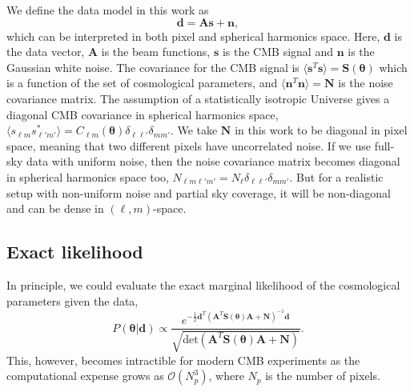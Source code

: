 \documentclass[twocolumn]{../common/aa}
\begin{document}
We define the data model in this work as
\begin{equation}
    \label{eq:data_model}
    \boldsymbol{d} = \boldsymbol{A} \boldsymbol{s} + \boldsymbol{n},
\end{equation}
which can be interpreted in both pixel and spherical harmonics space. Here, $\boldsymbol{d}$ is the data vector, $\boldsymbol{A}$ is the beam functions, $\boldsymbol{s}$ is the CMB signal and $\boldsymbol{n}$ is the Gaussian white noise. The covariance for the CMB signal is $\langle \boldsymbol{s}^T \boldsymbol{s}\rangle = \boldsymbol{S}(\boldsymbol{\theta})$ which is a function of the set of cosmological parameters, and $\langle \boldsymbol{n}^T \boldsymbol{n}\rangle = \boldsymbol{N}$ is the noise covariance matrix. The assumption of a statistically isotropic Universe gives a diagonal CMB covariance in spherical harmonics space, $\langle s_{\ell m} s^*_{\ell' m'}\rangle = C_{\ell m}(\boldsymbol{\theta}) \delta_{\ell\ell'}\delta_{mm'}$. We take $\boldsymbol{N}$ in this work to be diagonal in pixel space, meaning that two different pixels have uncorrelated noise. If we use full-sky data with uniform noise, then the noise covariance matrix becomes diagonal in spherical harmonics space too, $N_{\ell m \ell' m'} = N_\ell \delta_{\ell \ell'}\delta_{mm'}$. But for a realistic setup with non-uniform noise and partial sky coverage, it will be non-diagonal and can be dense in $(\ell, m)$-space.

\subsection{Exact likelihood}
\label{sec:exact-likelihood}

In principle, we could evaluate the exact marginal likelihood of the cosmological parameters given the data, 
\begin{equation}
    P(\boldsymbol{\theta} | \boldsymbol{d}) \propto \frac{e^{-\frac12 \boldsymbol{d}^T (\boldsymbol{A}^T \boldsymbol{S}(\boldsymbol{\theta}) \boldsymbol{A} + \boldsymbol{N})^{-1}\boldsymbol{d}}}{\sqrt{\text{det}\left(\boldsymbol{A}^T \boldsymbol{S}(\boldsymbol{\theta}) \boldsymbol{A} + \boldsymbol{N}\right)}}.
\end{equation}
This, however, becomes intractible for modern CMB experiments as the computational expense grows as $\mathcal{O}(N_p^3)$, where $N_p$ is the number of pixels.
\end{document}
